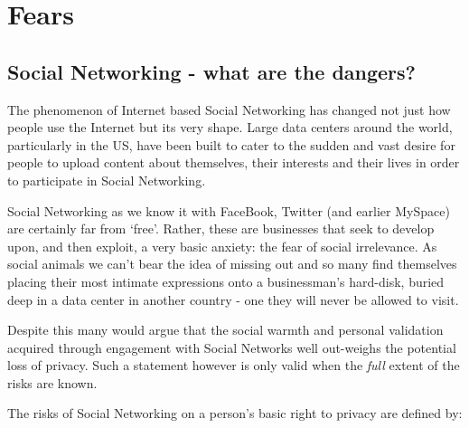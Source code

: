 \section{Fears}

\subsection{Social Networking - what are the dangers?}

The phenomenon of Internet based Social Networking has changed not just
how people use the Internet but its very shape. Large data centers
around the world, particularly in the US, have been built to cater to
the sudden and vast desire for people to upload content about
themselves, their interests and their lives in order to participate in
Social Networking.

Social Networking as we know it with FaceBook, Twitter (and earlier
MySpace) are certainly far from `free'. Rather, these are businesses
that seek to develop upon, and then exploit, a very basic anxiety: the
fear of social irrelevance. As social animals we can't bear the idea of
missing out and so many find themselves placing their most intimate
expressions onto a businessman's hard-disk, buried deep in a data center
in another country - one they will never be allowed to visit.

Despite this many would argue that the social warmth and personal
validation acquired through engagement with Social Networks well
out-weighs the potential loss of privacy. Such a statement however is
only valid when the \emph{full} extent of the risks are known.

The risks of Social Networking on a person's basic right to privacy are
defined by:

